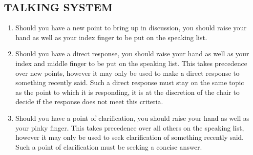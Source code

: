 \subsection{TALKING SYSTEM}
\label{talking-system}

\begin{enumerate}
 \item
  Should you have a new point to bring up in discussion, you should raise your hand as well as your index finger to be put on the speaking list.
 \item
  Should you have a direct response, you should raise your hand as well as your index and middle finger to be put on the speaking list. This takes precedence over new points, however it may only be used to make a direct response to something recently said. Such a direct response must stay on the same topic as the point to which it is responding, it is at the discretion of the chair to decide if the response does not meet this criteria.
 \item
  Should you have a point of clarification, you should raise your hand as well as your pinky finger. This takes precedence over all others on the speaking list, however it may only be used to seek clarification of something recently said. Such a point of clarification must be seeking a concise answer.
\end{enumerate}

